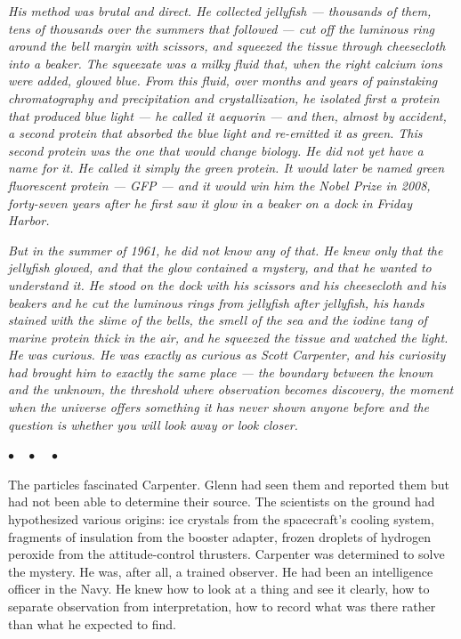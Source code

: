 \documentclass[12pt, letterpaper]{article}
\begin{document}
\emph{His method was brutal and direct. He collected jellyfish --- thousands of them, tens of thousands over the summers that followed --- cut off the luminous ring around the bell margin with scissors, and squeezed the tissue through cheesecloth into a beaker. The squeezate was a milky fluid that, when the right calcium ions were added, glowed blue. From this fluid, over months and years of painstaking chromatography and precipitation and crystallization, he isolated first a protein that produced blue light --- he called it aequorin --- and then, almost by accident, a second protein that absorbed the blue light and re-emitted it as green. This second protein was the one that would change biology. He did not yet have a name for it. He called it simply the green protein. It would later be named green fluorescent protein --- GFP --- and it would win him the Nobel Prize in 2008, forty-seven years after he first saw it glow in a beaker on a dock in Friday Harbor.}

\emph{But in the summer of 1961, he did not know any of that. He knew only that the jellyfish glowed, and that the glow contained a mystery, and that he wanted to understand it. He stood on the dock with his scissors and his cheesecloth and his beakers and he cut the luminous rings from jellyfish after jellyfish, his hands stained with the slime of the bells, the smell of the sea and the iodine tang of marine protein thick in the air, and he squeezed the tissue and watched the light. He was curious. He was exactly as curious as Scott Carpenter, and his curiosity had brought him to exactly the same place --- the boundary between the known and the unknown, the threshold where observation becomes discovery, the moment when the universe offers something it has never shown anyone before and the question is whether you will look away or look closer.}

\begin{center}
$\bullet\quad\bullet\quad\bullet$
\end{center}

The particles fascinated Carpenter. Glenn had seen them and reported them but had not been able to determine their source. The scientists on the ground had hypothesized various origins: ice crystals from the spacecraft's cooling system, fragments of insulation from the booster adapter, frozen droplets of hydrogen peroxide from the attitude-control thrusters. Carpenter was determined to solve the mystery. He was, after all, a trained observer. He had been an intelligence officer in the Navy. He knew how to look at a thing and see it clearly, how to separate observation from interpretation, how to record what was there rather than what he expected to find.
\end{document}
